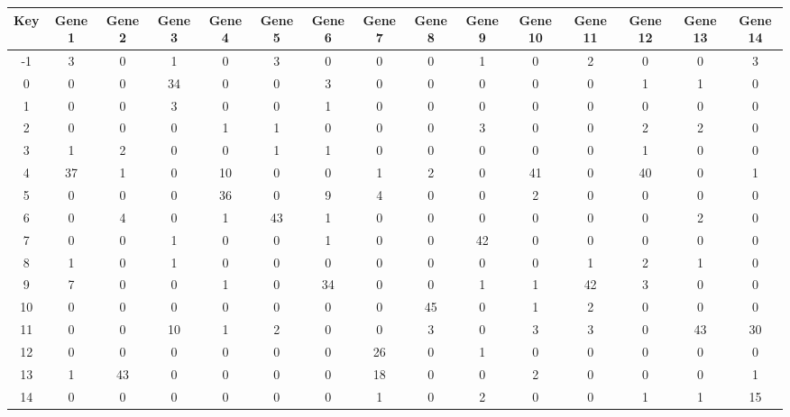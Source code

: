 \begin{tabular}{|c|c|c|c|c|c|c|c|c|c|c|c|c|c|c|}
\hline
Key & Gene 1 & Gene 2 & Gene 3 & Gene 4 & Gene 5 & Gene 6 & Gene 7 & Gene 8 & Gene 9 & Gene 10 & Gene 11 & Gene 12 & Gene 13 & Gene 14 \\
\hline
-1 & 3 & 0 & 1 & 0 & 3 & 0 & 0 & 0 & 1 & 0 & 2 & 0 & 0 & 3 \\
0 & 0 & 0 & 34 & 0 & 0 & 3 & 0 & 0 & 0 & 0 & 0 & 1 & 1 & 0 \\
1 & 0 & 0 & 3 & 0 & 0 & 1 & 0 & 0 & 0 & 0 & 0 & 0 & 0 & 0 \\
2 & 0 & 0 & 0 & 1 & 1 & 0 & 0 & 0 & 3 & 0 & 0 & 2 & 2 & 0 \\
3 & 1 & 2 & 0 & 0 & 1 & 1 & 0 & 0 & 0 & 0 & 0 & 1 & 0 & 0 \\
4 & 37 & 1 & 0 & 10 & 0 & 0 & 1 & 2 & 0 & 41 & 0 & 40 & 0 & 1 \\
5 & 0 & 0 & 0 & 36 & 0 & 9 & 4 & 0 & 0 & 2 & 0 & 0 & 0 & 0 \\
6 & 0 & 4 & 0 & 1 & 43 & 1 & 0 & 0 & 0 & 0 & 0 & 0 & 2 & 0 \\
7 & 0 & 0 & 1 & 0 & 0 & 1 & 0 & 0 & 42 & 0 & 0 & 0 & 0 & 0 \\
8 & 1 & 0 & 1 & 0 & 0 & 0 & 0 & 0 & 0 & 0 & 1 & 2 & 1 & 0 \\
9 & 7 & 0 & 0 & 1 & 0 & 34 & 0 & 0 & 1 & 1 & 42 & 3 & 0 & 0 \\
10 & 0 & 0 & 0 & 0 & 0 & 0 & 0 & 45 & 0 & 1 & 2 & 0 & 0 & 0 \\
11 & 0 & 0 & 10 & 1 & 2 & 0 & 0 & 3 & 0 & 3 & 3 & 0 & 43 & 30 \\
12 & 0 & 0 & 0 & 0 & 0 & 0 & 26 & 0 & 1 & 0 & 0 & 0 & 0 & 0 \\
13 & 1 & 43 & 0 & 0 & 0 & 0 & 18 & 0 & 0 & 2 & 0 & 0 & 0 & 1 \\
14 & 0 & 0 & 0 & 0 & 0 & 0 & 1 & 0 & 2 & 0 & 0 & 1 & 1 & 15 \\
\hline
\end{tabular}